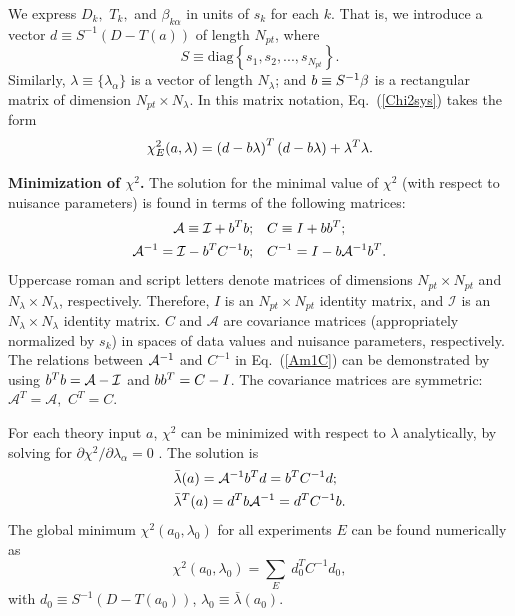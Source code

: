 We express $D_{k},$ $T_{k},$ and $\beta_{k\alpha}$
in units of $s_{k}$ for each $k$. That is, we introduce a vector
$d\equiv S^{-1}\left(D-T(a)\right)$ of length $N_{pt}$, where
\begin{equation}
S\equiv\mbox{diag}\left\{ s_{1},s_{2},...,s_{N_{pt}}\right\} .\label{S}
\end{equation}
Similarly, $\lambda\equiv\{\lambda_{\alpha}\}$ is a vector of length
$N_{\lambda}$; and $b\equiv S^{-1}\beta$ is a rectangular matrix
of dimension $N_{pt}\times N_{\lambda}$.
In this matrix notation, Eq.~(\ref{Chi2sys}) takes the form
\begin{equation}
\chi_{E}^{2}(a,\lambda)=\left(d-b\lambda\right)^{T}(d-
b\lambda)+\lambda^{T}\lambda.\label{Chi2sys2}
\end{equation}

{\bf Minimization of $\chi^{2}$.}
The solution for the minimal value of $\chi^{2}$ (with respect to nuisance parameters) is found in terms
of the following matrices:
\begin{align}
\mathcal{A}\equiv\mathcal{I}+ {b}^{T}b;~~~ & C\equiv I+bb^{T};\label{ACm1}\\
\mathcal{A}^{-1}=\mathcal{I}-b^{T}C^{-1}b;~~~ & C^{-1}=I-b\mathcal{A}^{-1}b^{T}.\label{Am1C}
\end{align}
Uppercase roman and script letters denote matrices of dimensions $N_{pt}\times N_{pt}$
and $N_{\lambda}\times N_{\lambda}$, respectively. Therefore, $I$
is an $N_{pt}\times N_{pt}$ identity matrix, and $\mathcal{I}$ is
an $N_{\lambda}\times N_{\lambda}$ identity matrix. $C$ and $\mathcal{A}$
are covariance matrices (appropriately normalized by $s_{k}$) in
spaces of data values and nuisance parameters, respectively. The relations
between ${\cal A}^{-1}$ and $C^{-1}$ in Eq.~(\ref{Am1C}) can be
demonstrated by using $b^{T}b=\mathcal{A}-\mathcal{I}$ and
$bb^{T}=C-I$. The covariance matrices are symmetric: $\mathcal{A}^{T}=\mathcal{A},$
$C^{T}=C$.

For each theory input $a$, $\chi^{2}$ can be minimized with respect
to $\lambda$ analytically, by solving for $\partial\chi^{2}/\partial\lambda_{\alpha}=0$
\cite{Pumplin:2002vw}. The solution is
\begin{align}
 & \bar{\lambda}(a)=\mathcal{A}^{-1}b^{T}d=b^{T}C^{-1}d;\label{lambda0}\\
 & \bar{\lambda}^{T}(a)=d^{T}b\mathcal{A}^{-1}=d^{T}C^{-1}b.
\end{align}
 The global minimum $\chi^{2}(a_{0},\lambda_{0})$ for all experiments
$E$ can be found numerically as
\begin{equation}
\chi^{2}(a_{0},\lambda_{0})=\sum_{E}\ d_{0}^{T}C^{-1}d_{0},\label{Chi2CovMat}
\end{equation}
 with $d_{0}\equiv S^{-1}\left(D-T(a_{0})\right)$, $\lambda_{0}\equiv\bar{\lambda}(a_{0})$.

